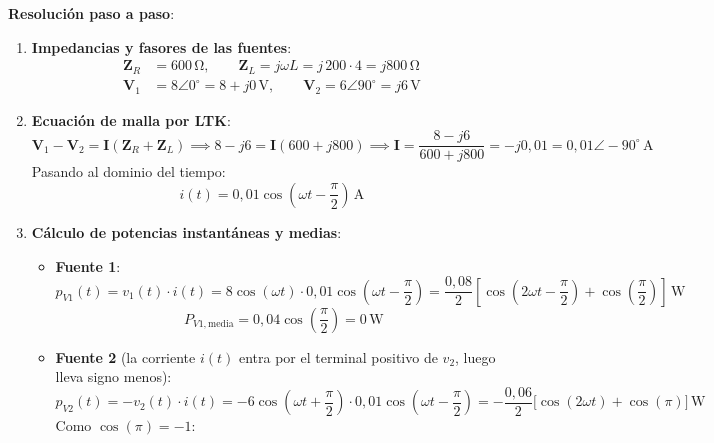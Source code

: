 \begin{ejemplo}
\textbf{Resolución paso a paso}:
\begin{enumerate}
    \item \textbf{Impedancias y fasores de las fuentes}:
    \begin{align*}
        \mathbf{Z}_R &= 600\,\si{\ohm}, \qquad \mathbf{Z}_L = j\omega L = j\,200\cdot 4 = j 800\,\si{\ohm} \\
        \mathbf{V}_1 &= 8\angle 0^\circ = 8 + j 0\,\si{\volt}, \qquad \mathbf{V}_2 = 6\angle 90^\circ = j 6\,\si{\volt}
    \end{align*}
    \item \textbf{Ecuación de malla por LTK}:
    \begin{equation*}
        \mathbf{V}_1 - \mathbf{V}_2 = \mathbf{I}(\mathbf{Z}_R + \mathbf{Z}_L) \implies 8 - j 6 = \mathbf{I}(600 + j 800) \implies \mathbf{I} = \frac{8 - j 6}{600 + j 800} = -j 0{,}01 = 0{,}01\angle -90^\circ\,\si{\ampere}
    \end{equation*}
    Pasando al dominio del tiempo:
    \begin{equation*}
        \boxed{i(t) = 0{,}01\cos\left(\omega t - \frac{\pi}{2}\right)\,\si{\ampere}}
    \end{equation*}
    \item \textbf{Cálculo de potencias instantáneas y medias}:
    \begin{itemize}
        \item \textbf{Fuente 1}:
        \begin{equation*}
            p_{V1}(t) = v_1(t)\cdot i(t) = 8\cos(\omega t)\cdot 0{,}01\cos\left(\omega t - \frac{\pi}{2}\right) = \frac{0{,}08}{2}\left[\cos\left(2\omega t - \frac{\pi}{2}\right) + \cos\left(\frac{\pi}{2}\right)\right]\,\si{\watt}
        \end{equation*}
        \begin{equation*}
            \boxed{P_{V1,\text{media}} = 0{,}04\cos\left(\frac{\pi}{2}\right) = 0\,\si{\watt}}
        \end{equation*}
        \item \textbf{Fuente 2} (la corriente $i(t)$ entra por el terminal positivo de $v_2$, luego lleva signo menos):
        \begin{equation*}
            p_{V2}(t) = -v_2(t)\cdot i(t) = -6\cos\left(\omega t + \frac{\pi}{2}\right)\cdot 0{,}01\cos\left(\omega t - \frac{\pi}{2}\right) = -\frac{0{,}06}{2}\big[\cos(2\omega t) + \cos(\pi)\big]\,\si{\watt}
        \end{equation*}
        Como $\cos(\pi) = -1$:
        \begin{equation*}

\end{equation*}
\end{itemize}
\end{enumerate}
\end{ejemplo}
